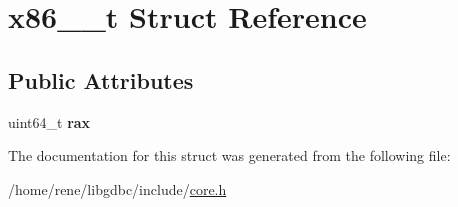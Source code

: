 \hypertarget{structx86__64__t}{\section{x86\-\_\-\_\-t Struct Reference}
\label{structx86__64__t}
}
\subsection*{Public Attributes}
\begin{DoxyCompactItemize}
\item 
\hypertarget{structx86__64__t_a0a14ee8ec938b25c931427940d7ae6f8}{uint64\-\_\-t {\bfseries rax}}\label{structx86__64__t_a0a14ee8ec938b25c931427940d7ae6f8}

\end{DoxyCompactItemize}


The documentation for this struct was generated from the following file\-:\begin{DoxyCompactItemize}
\item 
/home/rene/libgdbc/include/\hyperlink{core_8h}{core.\-h}\end{DoxyCompactItemize}
